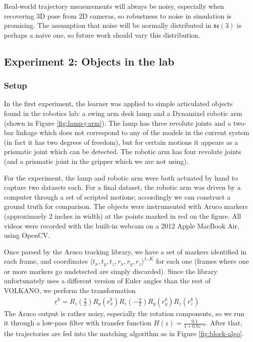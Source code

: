 \documentclass[letterpaper, 10 pt, conference]{ieeeconf}  %
\begin{document}
Real-world trajectory measurements will always be noisy, especially when recovering 3D pose from 2D cameras, so robustness to noise in simulation is promising. The assumption that noise will be normally distributed in $\mathfrak{se}(3)$ is perhaps a naive one, so future work should vary this distribution.

\subsection{Experiment 2: Objects in the lab}
\subsubsection{Setup}
In the first experiment, the learner was applied to simple articulated objects found in the robotics lab: a swing arm desk lamp and a Dynamixel robotic arm (shown in Figure \ref{fig:lamp+arm}). The lamp has three revolute joints and a two-bar linkage which does not correspond to any of the models in the current system (in fact it has two degrees of freedom), but for certain motions it appears as a prismatic joint which can be detected. The robotic arm has four revolute joints (and a prismatic joint in the gripper which we are not using).

For the experiment, the lamp and robotic arm were both actuated by hand to capture two datasets each. For a final dataset, the robotic arm was driven by a computer through a set of scripted motions; accordingly we can construct a ground truth for comparison. The objects were instrumented with Aruco markers (approximaely 2 inches in width) at the points marked in red on the figure. All videos were recorded with the built-in webcam on a 2012 Apple MacBook Air, using OpenCV.

Once parsed by the Aruco tracking library, we have a set of markers identified in each frame, and coordinates $\langle t_x, t_y, t_z, r_x, r_y, r_z \rangle^{1..K}$ for each one (frames where one or more markers go undetected are simply discarded). Since the library unfortunately uses a different version of Euler angles than the rest of VOLKANO, we perform the transformation
\begin{align}
  \underline{r}^k = R_z(\frac{\pi}{2})R_y(r_x^k)R_z(-\frac{\pi}{2})R_y(r_y^k)R_z(r_z^k)
\end{align}
The Aruco output is rather noisy, especially the rotation components, so we run it through a low-pass filter with transfer function $H(z) = \frac{0.1}{1 + 0.9z^{-1}}$. After that, the trajectories are fed into the matching algorithm as in Figure \ref{fig:block-algo}.
\end{document}
